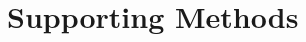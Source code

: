 \documentclass[12pt]{article}\usepackage[]{graphicx}\usepackage[dvipsnames]{xcolor}
\begin{document}


\section {Supporting Methods}
\end{document}
